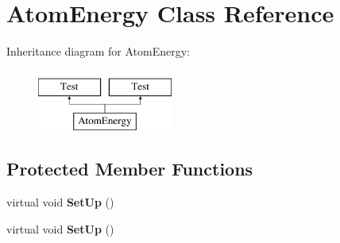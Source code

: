 \hypertarget{classAtomEnergy}{\section{Atom\-Energy Class Reference}
\label{classAtomEnergy}
}
Inheritance diagram for Atom\-Energy\-:\begin{figure}[H]
\begin{center}
\leavevmode
\includegraphics[height=2.000000cm]{classAtomEnergy}
\end{center}
\end{figure}
\subsection*{Protected Member Functions}
\begin{DoxyCompactItemize}
\item 
\hypertarget{classAtomEnergy_a6aadb2fedfe4de8b3ca04cb3a8527b41}{virtual void {\bfseries Set\-Up} ()}\label{classAtomEnergy_a6aadb2fedfe4de8b3ca04cb3a8527b41}

\item 
\hypertarget{classAtomEnergy_a6aadb2fedfe4de8b3ca04cb3a8527b41}{virtual void {\bfseries Set\-Up} ()}\label{classAtomEnergy_a6aadb2fedfe4de8b3ca04cb3a8527b41}

\end{DoxyCompactItemize}
